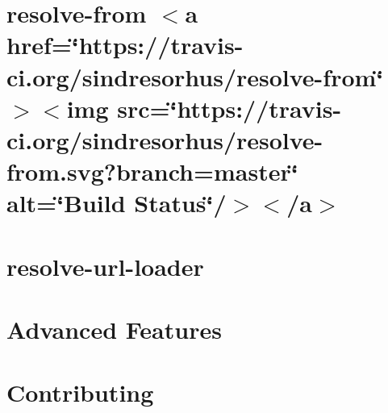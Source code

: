 \documentclass[twoside]{book}
\newcommand{\+}{\discretionary{\mbox{\scriptsize$\hookleftarrow$}}{}{}}
\begin{document}
\chapter{resolve-\/from \texorpdfstring{$<$}{<}a href=\char`\"{}https\+://travis-\/ci.\+org/sindresorhus/resolve-\/from\char`\"{} \texorpdfstring{$>$}{>}\texorpdfstring{$<$}{<}img src=\char`\"{}https\+://travis-\/ci.\+org/sindresorhus/resolve-\/from.\+svg?branch=master\char`\"{} alt=\char`\"{}\+Build Status\char`\"{}/\texorpdfstring{$>$}{>}\texorpdfstring{$<$}{<}/a\texorpdfstring{$>$}{>}}
\label{md__c___users_vaishnavi_jadhav__desktop__developer_code_mean_stack_example_client_node_modules_resolve_from_readme}

\chapter{resolve-\/url-\/loader}
\label{md__c___users_vaishnavi_jadhav__desktop__developer_code_mean_stack_example_client_node_modules_r3650b38881817f5bb32516590cb30276}

\chapter{Advanced Features}
\label{md__c___users_vaishnavi_jadhav__desktop__developer_code_mean_stack_example_client_node_modules_r26467323a0f4073d4df9f64573194096}

\chapter{Contributing}
\label{md__c___users_vaishnavi_jadhav__desktop__developer_code_mean_stack_example_client_node_modules_r943769b8c9b79a107e646833bde9dcdf}

\end{document}
